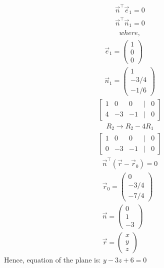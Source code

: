 \documentclass[journal]{IEEEtran}
\begin{document}
\begin{align}
\vec{n}^\top \vec{e}_1 = 0\\
\vec{n}^\top \vec{n}_1 = 0
\end{align}
\begin{align*}
where,  
\end{align*}
\begin{align}
\vec{e}_1 = \begin{pmatrix} 1 \\ 0 \\ 0 \end{pmatrix}\\ \vec{n}_1 = \begin{pmatrix} 1 \\ -3/4 \\ -1/6 \end{pmatrix}
\end{align}
\begin{align}
\begin{bmatrix}1 & 0 & 0 & | & 0 \\4 & -3 & -1 & | & 0\end{bmatrix}
\end{align}
\begin{align}
R_2 \rightarrow R_2 - 4R_1
\end{align}
\begin{align}
\begin{bmatrix}1 & 0 & 0 & | & 0 \\0 & -3 & -1 & | & 0\end{bmatrix}
\end{align}
\begin{align}
\vec{n}^\top (\vec{r} - \vec{r}_0) = 0\\
\vec{r}_0 = \begin{pmatrix} 0 \\ -3/4 \\ -7/4 \end{pmatrix}\\
\vec{n} = \begin{pmatrix}0 \\1 \\-3\end{pmatrix}\\
\vec{r} = \begin{pmatrix}x \\y \\z\end{pmatrix}
\end{align}
Hence, equation of the plane is: $y - 3z + 6 = 0$ 
\end{document}
